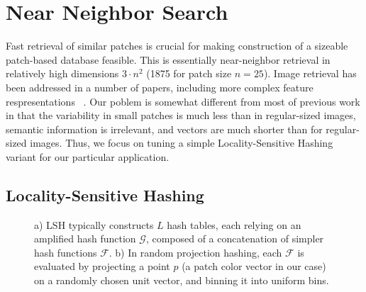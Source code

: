 \section{Near Neighbor Search}\label{sec:nn}

Fast retrieval of similar patches is crucial for making
construction of a sizeable patch-based database feasible.
This is essentially near-neighbor retrieval in
relatively high dimensions $3 \cdot n^2$ (1875 for patch size $n=25$).
Image retrieval has been addressed in a number of papers,
including more complex feature respresentations ~\cite{perronnin2010large}.
Our poblem is somewhat different from most of previous work
in that the variability
in small patches is much less than in regular-sized images,
semantic information is irrelevant, and vectors are much shorter
than for regular-sized images.
Thus, we focus on tuning a simple Locality-Sensitive Hashing variant for our
particular application.

\subsection{Locality-Sensitive Hashing}

\begin{figure}[ht!]
\centering
{}
\caption{a) LSH typically constructs
$L$ hash tables, each relying on an amplified
hash function $\mathcal{G}$, composed of a concatenation
of simpler hash functions $\mathcal{F}$. b) In
random projection hashing, each
$\mathcal{F}$ is evaluated by projecting a point $p$
(a patch color vector in our case) on a randomly chosen
unit vector, and binning it into uniform bins.}
\label{fig:lsh}
\end{figure}

